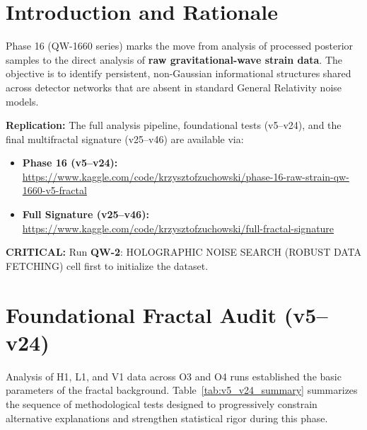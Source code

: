 \documentclass[11pt,a4paper]{book}
\theoremstyle{remark}
\newcommand{\QW}[1]{\textbf{QW-#1}}
\begin{document}
\section{Introduction and Rationale}
Phase 16 (QW-1660 series) marks the move from analysis of processed posterior samples to the direct analysis of \textbf{raw gravitational-wave strain data}. The objective is to identify persistent, non-Gaussian informational structures shared across detector networks that are absent in standard General Relativity noise models.

\textbf{Replication:} The full analysis pipeline, foundational tests (v5--v24), and the final multifractal signature (v25--v46) are available via:
\begin{itemize}
    \item \textbf{Phase 16 (v5--v24):} \url{https://www.kaggle.com/code/krzysztofzuchowski/phase-16-raw-strain-qw-1660-v5-fractal}
    \item \textbf{Full Signature (v25--v46):} \url{https://www.kaggle.com/code/krzysztofzuchowski/full-fractal-signature}
\end{itemize}
\textbf{CRITICAL:} Run \QW{2}: HOLOGRAPHIC NOISE SEARCH (ROBUST DATA FETCHING) cell first to initialize the dataset.

\section{Foundational Fractal Audit (v5--v24)}
Analysis of H1, L1, and V1 data across O3 and O4 runs established the basic parameters of the fractal background. Table~\ref{tab:v5_v24_summary} summarizes the sequence of methodological tests designed to progressively constrain alternative explanations and strengthen statistical rigor during this phase.
\end{document}
